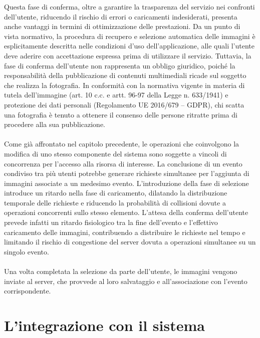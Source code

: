 Questa fase di conferma, oltre a garantire la trasparenza del servizio nei confronti dell’utente, 
riducendo il rischio di errori o caricamenti indesiderati, presenta anche vantaggi in termini di ottimizzazione delle prestazioni. 
\clearpage
Da un punto di vista normativo, la procedura di recupero e selezione automatica delle immagini è esplicitamente descritta nelle condizioni d’uso dell’applicazione, 
alle quali l’utente deve aderire con accettazione espressa prima di utilizzare il servizio. 
Tuttavia, la fase di conferma dell’utente non rappresenta un obbligo giuridico, 
poiché la responsabilità della pubblicazione di contenuti multimediali ricade sul soggetto che realizza la fotografia. 
In conformità con la normativa vigente in materia di tutela dell’immagine (art. 10 c.c. e artt. 96-97 della Legge n. 633/1941) e protezione dei dati personali (Regolamento UE 2016/679 – GDPR), 
chi scatta una fotografia è tenuto a ottenere il consenso delle persone ritratte prima di procedere alla sua pubblicazione.\\
\\
Come già affrontato nel capitolo precedente, le operazioni che coinvolgono la modifica di uno stesso componente del sistema 
sono soggette a vincoli di concorrenza per l’accesso alla risorsa di interesse. 
La conclusione di un evento condiviso tra più utenti potrebbe generare richieste simultanee per l’aggiunta di immagini associate a un medesimo evento. 
L’introduzione della fase di selezione introduce un ritardo nella fase di caricamento, 
dilatando la distribuzione temporale delle richieste e riducendo la probabilità di collisioni dovute a operazioni concorrenti sullo stesso elemento.
L’attesa della conferma dell’utente prevede infatti un ritardo fisiologico tra la fine dell’evento e l’effettivo caricamento delle immagini, 
contribuendo a distribuire le richieste nel tempo e limitando il rischio di congestione del server dovuta a operazioni simultanee su un singolo evento.\\
\\
Una volta completata la selezione da parte dell’utente, le immagini vengono inviate al server, che provvede al loro salvataggio e all’associazione con l’evento corrispondente.


\clearpage

\section{L'integrazione con il sistema}

